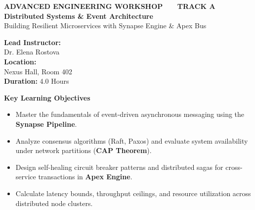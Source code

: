 \documentclass[11pt, a4paper, parskip=half]{scrartcl}
\begin{document}

\begin{headerbox}
    \begin{minipage}[t]{0.68\textwidth}
        {\sffamily\small\color{accentTeal}\textbf{ADVANCED ENGINEERING WORKSHOP \ \textperiodcentered\ \ TRACK A}} \\[2pt]
        {\sffamily\Huge\bfseries\color{white} Distributed Systems \& Event Architecture} \\[4pt]
        {\sffamily\large\color{borderSlate} Building Resilient Microservices with Synapse Engine \& Apex Bus}
    \end{minipage}%
    \hfill
    \begin{minipage}[t]{0.28\textwidth}
        \raggedleft
        \small\sffamily\color{white}
        \textbf{Lead Instructor:} \\
        Dr. Elena Rostova \\[2pt]
        \textbf{Location:} \\
        Nexus Hall, Room 402 \\[2pt]
        \textbf{Duration:} 4.0 Hours
    \end{minipage}
\end{headerbox}

\vspace{-2pt}

\begin{objectivesbox}
    {\large\bfseries\sffamily\color{accentTeal} Key Learning Objectives}
    \vspace{2pt}
    \begin{itemize}[leftmargin=16pt, itemsep=1pt, label=\textcolor{accentTeal}{\faCheckCircle}]
        \item Master the fundamentals of event-driven asynchronous messaging using the \textbf{Synapse Pipeline}.
        \item Analyze consensus algorithms (Raft, Paxos) and evaluate system availability under network partitions (\textbf{CAP Theorem}).
        \item Design self-healing circuit breaker patterns and distributed sagas for cross-service transactions in \textbf{Apex Engine}.
        \item Calculate latency bounds, throughput ceilings, and resource utilization across distributed node clusters.
    \end{itemize}
\end{objectivesbox}
\end{document}
